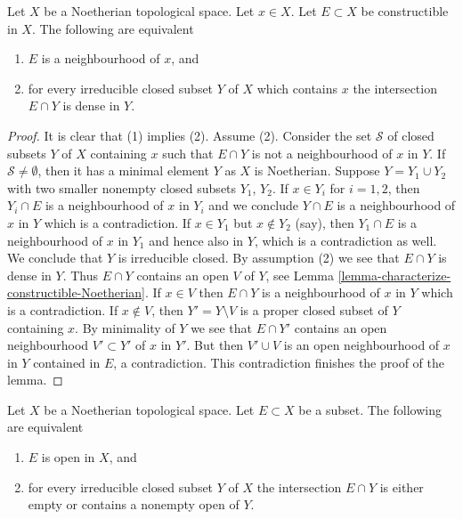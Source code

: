 \begin{lemma}
\label{lemma-constructible-neighbourhood-Noetherian}
Let $X$ be a Noetherian topological space.
Let $x \in X$.
Let $E \subset X$ be constructible in $X$.
The following are equivalent
\begin{enumerate}
\item $E$ is a neighbourhood of $x$, and
\item for every irreducible closed subset $Y$ of $X$ which contains
$x$ the intersection $E \cap Y$ is dense in $Y$.
\end{enumerate}
\end{lemma}

\begin{proof}
It is clear that (1) implies (2). Assume (2).
Consider the set $\mathcal{S}$ of closed subsets $Y$ of $X$ containing $x$
such that $E \cap Y$ is not a neighbourhood of $x$ in $Y$.
If $\mathcal{S} \not = \emptyset$, then it has a minimal element $Y$
as $X$ is Noetherian. Suppose $Y = Y_1 \cup Y_2$ with two smaller nonempty
closed subsets $Y_1$, $Y_2$. If $x \in Y_i$ for $i = 1, 2$, then $Y_i \cap E$
is a neighbourhood of $x$ in $Y_i$ and we conclude $Y \cap E$ is a
neighbourhood of $x$ in $Y$ which is a contradiction. If $x \in Y_1$ but
$x \not\in Y_2$ (say), then $Y_1 \cap E$ is a neighbourhood of $x$ in
$Y_1$ and hence also in $Y$, which is a contradiction as well.
We conclude that $Y$ is irreducible closed. By assumption (2) we see that
$E \cap Y$ is dense in $Y$. Thus $E \cap Y$ contains an open $V$ of $Y$, see
Lemma \ref{lemma-characterize-constructible-Noetherian}.
If $x \in V$ then $E \cap Y$ is a neighbourhood of $x$ in $Y$ which
is a contradiction. If $x \not \in V$, then $Y' = Y \setminus V$ is a
proper closed subset of $Y$ containing $x$. By minimality of $Y$
we see that $E \cap Y'$ contains an open neighbourhood $V' \subset Y'$
of $x$ in $Y'$. But then $V' \cup V$ is an open neighbourhood of $x$
in $Y$ contained in $E$, a contradiction.
This contradiction finishes the proof of the lemma.
\end{proof}

\begin{lemma}
\label{lemma-characterize-open-Noetherian}
Let $X$ be a Noetherian topological space.
Let $E \subset X$ be a subset.
The following are equivalent
\begin{enumerate}
\item $E$ is open in $X$, and
\item for every irreducible closed subset $Y$ of $X$
the intersection $E \cap Y$ is either empty or
contains a nonempty open of $Y$.
\end{enumerate}
\end{lemma}

